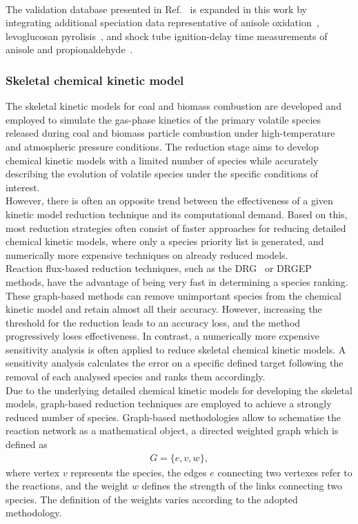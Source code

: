 \begin{refsection}
\\
The validation database presented in Ref.~\cite{Langer2023} is expanded in this work by integrating additional speciation data representative of anisole oxidation~\cite{Chen2022}, levoglucosan pyrolisis~\cite{Norinaga2013}, and shock tube ignition-delay time measurements of anisole and propionaldehyde~\cite{Pelucchi2015, AkihKumgeh2011}.

 

\subsubsection{Skeletal chemical kinetic model}
The skeletal kinetic models for coal and biomass combustion are developed and employed to simulate the gas-phase kinetics of the primary volatile species released during coal and biomass particle combustion under high-temperature and atmospheric pressure conditions. The reduction stage aims to develop chemical kinetic models with a limited number of species while accurately describing the evolution of volatile species under the specific conditions of interest.
\\
However, there is often an opposite trend between the effectiveness of a given kinetic model reduction technique and its computational demand. Based on this, most reduction strategies often consist of faster approaches for reducing detailed chemical kinetic models, where only a species priority list is generated, and numerically more expensive techniques on already reduced models.
\\
Reaction flux-based reduction techniques, such as the DRG~\cite{Lu2005, Lu2020} or DRGEP~\cite{PepiotDesjardins2008a} methods, have the advantage of being very fast in determining a species ranking. These graph-based methods can remove unimportant species from the chemical kinetic model and retain almost all their accuracy. However, increasing the threshold for the reduction leads to an accuracy loss, and the method progressively loses effectiveness. In contrast, a numerically more expensive sensitivity analysis is often applied to reduce skeletal chemical kinetic models. A sensitivity analysis calculates the error on a specific defined target following the removal of each analysed species and ranks them accordingly.
\\
Due to the underlying detailed chemical kinetic models for developing the skeletal models, graph-based reduction techniques are employed to achieve a strongly reduced number of species. Graph-based methodologies allow to schematise the reaction network as a mathematical object, a directed weighted graph which is defined as
\begin{align}
G = \{e,v,w\},
\end{align}
where vertex $v$ represents the species, the edges $e$ connecting two vertexes refer to the reactions, and the weight $w$ defines the strength of the links connecting two species. The definition of the weights varies according to the adopted methodology.



\end{refsection}
